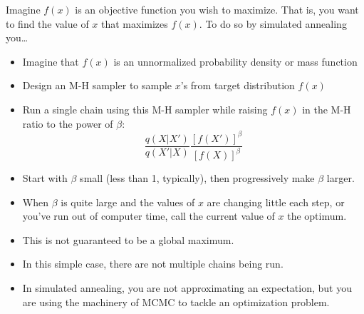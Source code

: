  Imagine $f(x)$ is an objective function you wish to maximize.  That is, you want to find the value of $x$ that maximizes $f(x)$. To do so by simulated annealing you\ldots
\begin{itemize}
\item Imagine that $f(x)$ is an unnormalized probability density or mass function
\item Design an M-H sampler to sample $x$'s from target distribution $f(x)$
\item Run a single chain using this M-H sampler while raising $f(x)$ in the M-H ratio to the power of $\beta$:
\[
	\frac{q(X|X')}{q(X'|X)} \frac{[f(X')]^{\beta}}{[f(X)]^{\beta}}
\] 
\item Start with $\beta$ small (less than 1, typically), then progressively make $\beta$ larger.
\item When $\beta$ is quite large and the values of $x$ are changing little each step, or you've run out of computer time, call the current value of $x$ the optimum.
\item This is not guaranteed to be a global maximum. 
\item In this simple case, there are not multiple chains being run.
\item In simulated annealing, you are not approximating an expectation, but you are using the machinery of MCMC to tackle an optimization problem.
\end{itemize}






